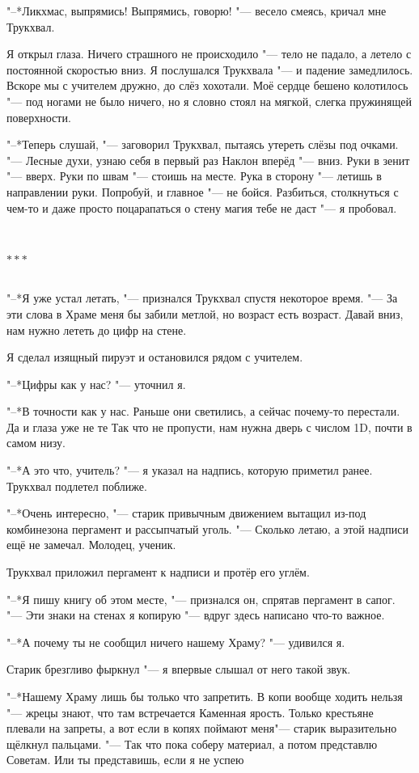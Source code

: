 \documentclass[a4paper,10pt,fleqn]{book}
\newcommand{\ldotst}{\so{...}\xspace}
\newcommand{\razd}{~\\{\centering\Large\bfseries$\ast \ast \ast$\par}~\\}
\begin{document}
"--*Ликхмас, выпрямись!
Выпрямись, говорю! "--- весело смеясь, кричал мне Трукхвал.

Я открыл глаза.
Ничего страшного не происходило "--- тело не падало, а летело с постоянной скоростью вниз.
Я послушался Трукхвала "--- и падение замедлилось.
Вскоре мы с учителем дружно, до слёз хохотали.
Моё сердце бешено колотилось "--- под ногами не было ничего, но я словно стоял на мягкой, слегка пружинящей поверхности.

"--*Теперь слушай, "--- заговорил Трукхвал, пытаясь утереть слёзы под очками.
"--- Лесные духи, узнаю себя в первый раз\ldotst
Наклон вперёд "--- вниз.
Руки в зенит "--- вверх.
Руки по швам "--- стоишь на месте.
Рука в сторону "--- летишь в направлении руки.
Попробуй, и главное "--- не бойся.
Разбиться, столкнуться с чем-то и даже просто поцарапаться о стену магия тебе не даст "--- я пробовал.

\razd

"--*Я уже устал летать, "--- признался Трукхвал спустя некоторое время.
"--- За эти слова в Храме меня бы забили метлой, но возраст есть возраст.
Давай вниз, нам нужно лететь до цифр на стене.

Я сделал изящный пируэт и остановился рядом с учителем.

"--*Цифры как у нас? "--- уточнил я.

"--*В точности как у нас.
Раньше они светились, а сейчас почему-то перестали.
Да и глаза уже не те\ldotst
Так что не пропусти, нам нужна дверь с числом 1D, почти в самом низу.

"--*А это что, учитель? "--- я указал на надпись, которую приметил ранее.
Трукхвал подлетел поближе.

"--*Очень интересно, "--- старик привычным движением вытащил из-под комбинезона пергамент и рассыпчатый уголь.
"--- Сколько летаю, а этой надписи ещё не замечал.
Молодец, ученик.

Трукхвал приложил пергамент к надписи и протёр его углём.

"--*Я\ldotst пишу книгу об этом месте, "--- признался он, спрятав пергамент в сапог.
"--- Эти знаки на стенах я копирую "--- вдруг здесь написано что-то важное.

"--*А почему ты не сообщил ничего нашему Храму? "--- удивился я.

Старик брезгливо фыркнул "--- я впервые слышал от него такой звук.

"--*Нашему Храму лишь бы только что запретить.
В копи вообще ходить нельзя "--- жрецы знают, что там встречается Каменная ярость.
Только крестьяне плевали на запреты, а вот если в копях поймают меня\ldotst "--- старик выразительно щёлкнул пальцами.
"--- Так что пока соберу материал, а потом представлю Советам.
Или ты представишь, если я не успею\ldotst
\end{document}

